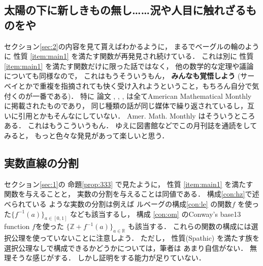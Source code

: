 \documentclass[leqno, a4paper, 12pt]{jsarticle}
\theoremstyle{definition}
\newcommand{\zz}{\mathbb{Z}}
\newcommand{\rr}{\mathbb{R}}
\newcommand{\mysw}{\textup{(Spathic)}}
\begin{document}
\subsection{太陽の下に新しきもの無し\ldots\ldots 況や人目に触れざるものをや}
セクション\ref{sec:2}の内容を見て貰えばわかるように，
まるでベーグルの輪のように
性質
\ref{item:main1}
を満たす関数が再発見され続けている．
これは別に
性質
\ref{item:main1}
を満たす関数だけに限った話ではなく，
他の数学的な定理や議論についても同様なので，
これはもうそういうもん，
\textbf{みんなも覚悟しよう}
(サーベイとかで重複を指摘されても快く受け入れようということ，もちろん自分で気付くのが一番である)．
特に
論文
\cite{MR1033359}, 
\cite{MR3453542}, 
\cite{MR3756332}, 
\cite{MR4022760}
は全てAmerican Mathematical Monthly 
に掲載されたものであり，
同じ種類の話が同じ媒体で繰り返されているし，互いに引用とかもそんなにしていない．
Amer. Math. Monthly はそういうところある．
これはもうこういうもん．
ゆえに図書館などでこの月刊誌を通読をしてみると，
もっと色々な発見があって楽しいと思う．


\subsection{実数直線の分割}
セクション\ref{sec:1}の
命題\ref{prop:333}
で見たように，
性質
\ref{item:main1}
を満たす関数を与えることと，
実数の分割を与えることは同値である．
構成\ref{con:hz}で述べられている
ような実数の分割は例えば
ルベーグの構成\ref{con:le}
の関数$f$
を使った$\{f^{-1}(a)\}_{a\in [0, 1]}$
なども該当するし，
構成
\ref{con:om}
のConway's base13 function 
$f$を使った
$\{\zz+ f^{-1}(a)\}_{a\in \rr}$
も該当する．
これらの関数の構成には選択公理を使っていないことに注意しよう．
ただし，
性質\mysw 
を満たす族を選択公理なしで構成できるかどうかについては，筆者は
あまり自信がない．
無理そうな感じがする．
しかし証明をする能力が足りていない．
\end{document}
